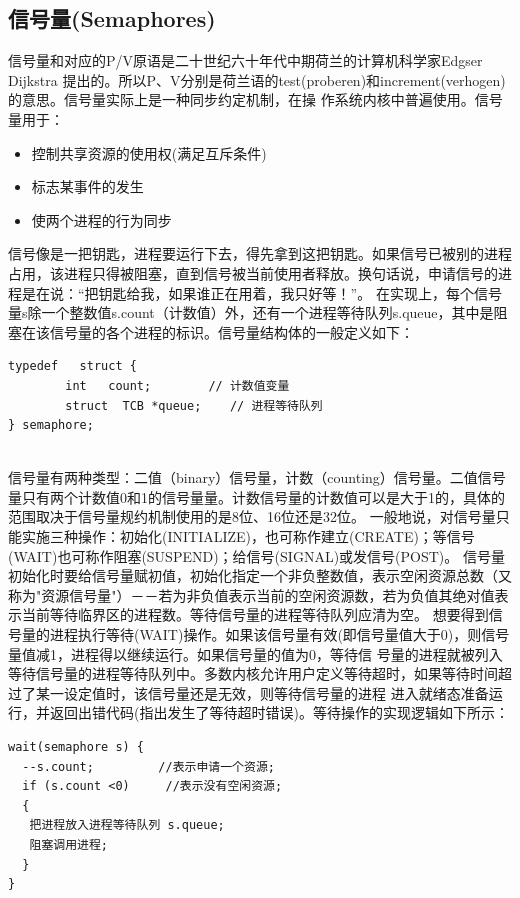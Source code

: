 \documentclass[a4paper,12pt]{report}
\begin{document}
\begin{appendix}
\subsection{  信号量(Semaphores)}
\begin{spacing}{1.5}
 信号量和对应的P/V原语是二十世纪六十年代中期荷兰的计算机科学家Edgser Dijkstra 提出的。所以P、V分别是荷兰语的test(proberen)和increment(verhogen)的意思。信号量实际上是一种同步约定机制，在操 作系统内核中普遍使用。信号量用于：
 \begin{itemize}
   \item 	控制共享资源的使用权(满足互斥条件)
   \item 	标志某事件的发生
   \item 	使两个进程的行为同步
 \end{itemize}
  信号像是一把钥匙，进程要运行下去，得先拿到这把钥匙。如果信号已被别的进程占用，该进程只得被阻塞，直到信号被当前使用者释放。换句话说，申请信号的进程是在说：“把钥匙给我，如果谁正在用着，我只好等！”。
    在实现上，每个信号量s除一个整数值s.count（计数值）外，还有一个进程等待队列s.queue，其中是阻塞在该信号量的各个进程的标识。信号量结构体的一般定义如下：
   \begin{lstlisting}
typedef   struct {
        int   count;        // 计数值变量
        struct  TCB *queue;    // 进程等待队列
} semaphore;


   \end{lstlisting}
 信号量有两种类型：二值（binary）信号量，计数（counting）信号量。二值信号量只有两个计数值0和1的信号量量。计数信号量的计数值可以是大于1的，具体的范围取决于信号量规约机制使用的是8位、16位还是32位。
    一般地说，对信号量只能实施三种操作：初始化(INITIALIZE)，也可称作建立(CREATE)；等信号(WAIT)也可称作阻塞(SUSPEND)；给信号(SIGNAL)或发信号(POST)。
    信号量初始化时要给信号量赋初值，初始化指定一个非负整数值，表示空闲资源总数（又称为"资源信号量"）－－若为非负值表示当前的空闲资源数，若为负值其绝对值表示当前等待临界区的进程数。等待信号量的进程等待队列应清为空。
    想要得到信号量的进程执行等待(WAIT)操作。如果该信号量有效(即信号量值大于0)，则信号量值减1，进程得以继续运行。如果信号量的值为0，等待信 号量的进程就被列入等待信号量的进程等待队列中。多数内核允许用户定义等待超时，如果等待时间超过了某一设定值时，该信号量还是无效，则等待信号量的进程 进入就绪态准备运行，并返回出错代码(指出发生了等待超时错误)。等待操作的实现逻辑如下所示：
   \begin{lstlisting}
wait(semaphore s) {
  --s.count;         //表示申请一个资源;
  if (s.count <0)     //表示没有空闲资源;
  {
   把进程放入进程等待队列 s.queue;
   阻塞调用进程;
  }
}



\end{lstlisting}
\end{spacing}
\end{appendix}
\end{document}
